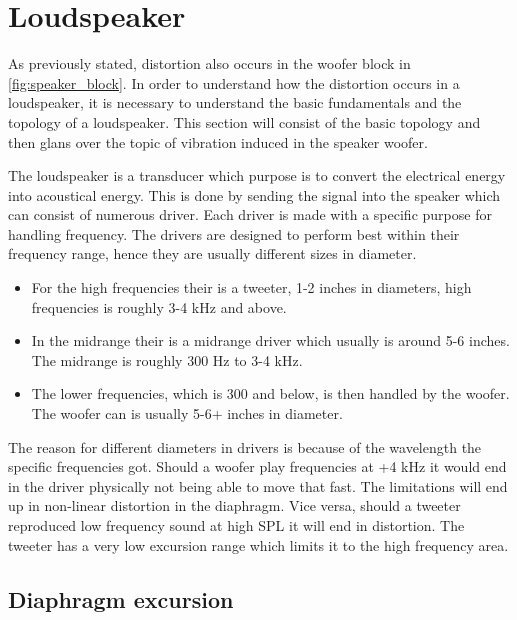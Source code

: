 \section{Loudspeaker}

As previously stated, distortion also occurs in the woofer block in \autoref{fig:speaker_block}. In order to understand how the distortion occurs in a loudspeaker, it is necessary to understand the basic fundamentals and the topology of a loudspeaker. This section will consist of the basic topology and then glans over the topic of vibration induced in the speaker woofer.

The loudspeaker is a transducer which purpose is to convert the electrical energy into acoustical energy. This is done by sending the signal into the speaker which can consist of numerous driver. Each driver is made with a specific purpose for handling frequency. The drivers are designed to perform best within their frequency range, hence they are usually different sizes in diameter.
\begin{itemize}
\item[] For the high frequencies their is a tweeter, 1-2 inches in diameters, high frequencies is roughly 3-4 kHz and above.
\item[] In the midrange their is a midrange driver which usually is around 5-6 inches. The midrange is roughly 300 Hz to 3-4 kHz. 
\item[] The lower frequencies, which is 300 and below, is then handled by the woofer. The woofer can is usually 5-6+ inches in diameter.
\end{itemize}
The reason for different diameters in drivers is because of the wavelength the specific frequencies got. Should a woofer play frequencies at +4 kHz it would end in the driver physically not being able to move that fast. The limitations will end up in non-linear distortion in the diaphragm. Vice versa, should a tweeter reproduced low frequency sound at high \gls{SPL} it will end in distortion. The tweeter has a very low excursion range which limits it to the high frequency area.



\subsection{Diaphragm excursion}

